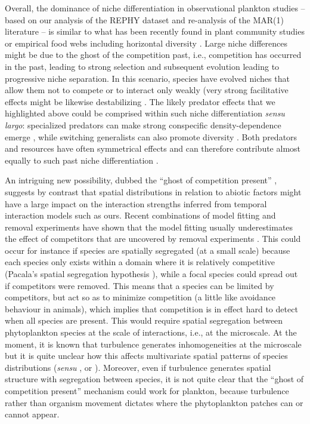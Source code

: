 \documentclass[10pt]{article}
\begin{document}
Overall, the dominance of niche differentiation in observational plankton
studies -- based on our analysis of the REPHY dataset and re-analysis
of the MAR(1) literature -- is similar to what has been recently
found in plant community studies \citep{volkov_patterns_2007,adler_competition_2018}
or empirical food webs including horizontal diversity \citep{barabas_self-regulation_2017}.
Large niche differences might be due to the ghost of the competition
past, i.e., competition has occurred in the past, leading to strong
selection and subsequent evolution leading to progressive niche separation.
In this scenario, species have evolved niches that allow them not
to compete or to interact only weakly (very strong facilitative effects
might be likewise destabilizing \citep{coyte_ecology_2015}. The
likely predator effects that we highlighted above could be comprised
within such niche differentiation \emph{sensu largo}: specialized
predators can make strong conspecific density-dependence emerge \citep{bagchi_pathogens_2014,comita_testing_2014},
while switching generalists can also promote diversity \citep{vallina2014maximal}.
Both predators and resources have often symmetrical effects and can
therefore contribute almost equally to such past niche differentiation \citep{chesson_updates_2018}.

An intriguing new possibility, dubbed the ``ghost of competition
present'' \citep{tuck_strong_2018}, suggests by contrast that
spatial distributions in relation to abiotic factors might have a
large impact on the interaction strengths inferred from temporal interaction
models such as ours. Recent combinations of model fitting and removal
experiments have shown that the model fitting usually underestimates
the effect of competitors that are uncovered by removal experiments \citep{tuck_strong_2018,adler_weak_2018}.
This could occur for instance if species are spatially segregated
(at a small scale) because each species only exists within a domain
where it is relatively competitive (Pacala's spatial segregation hypothesis \citealt{pacala1997biologically}),
while a focal species could spread out if competitors were removed.
This means that a species can be limited by competitors, but act so
as to minimize competition (a little like avoidance behaviour in animals),
which implies that competition is in effect hard to detect when all
species are present. This would require spatial segregation between
phytoplankton species at the scale of interactions, i.e., at the microscale.
At the moment, it is known that turbulence generates inhomogeneities
at the microscale \citep{barton_impact_2014,breier_emergence_2018}
but it is quite unclear how this affects multivariate spatial patterns
of species distributions (\textit{sensu} \citealt{bolker_spatial_1999},
or \citealt{murrell_heteromyopia_2003}). Moreover,
even if turbulence generates spatial structure with segregation between
species, it is not quite clear that the ``ghost of competition present''
mechanism could work for plankton, because turbulence rather than
organism movement dictates where the phytoplankton patches can or
cannot appear.
\end{document}
